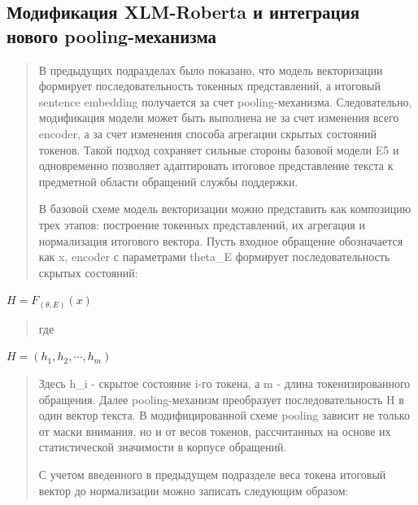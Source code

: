 \hypertarget{ux43cux43eux434ux438ux444ux438ux43aux430ux446ux438ux44f-xlm-roberta-ux438-ux438ux43dux442ux435ux433ux440ux430ux446ux438ux44f-ux43dux43eux432ux43eux433ux43e-pooling-ux43cux435ux445ux430ux43dux438ux437ux43cux430}{%
\subsection{Модификация XLM-Roberta и интеграция нового
pooling-механизма}\label{ux43cux43eux434ux438ux444ux438ux43aux430ux446ux438ux44f-xlm-roberta-ux438-ux438ux43dux442ux435ux433ux440ux430ux446ux438ux44f-ux43dux43eux432ux43eux433ux43e-pooling-ux43cux435ux445ux430ux43dux438ux437ux43cux430}}

\begin{quote}
В предыдущих подразделах было показано, что модель векторизации
формирует последовательность токенных представлений, а итоговый sentence
embedding получается за счет pooling-механизма. Следовательно,
модификация модели может быть выполнена не за счет изменения всего
encoder, а за счет изменения способа агрегации скрытых состояний
токенов. Такой подход сохраняет сильные стороны базовой модели E5 и
одновременно позволяет адаптировать итоговое представление текста к
предметной области обращений службы поддержки.

В базовой схеме модель векторизации можно представить как композицию
трех этапов: построение токенных представлений, их агрегация и
нормализация итогового вектора. Пусть входное обращение обозначается как
x, encoder с параметрами theta\_E формирует последовательность скрытых
состояний:
\end{quote}

\(H = F_{(\theta,E)}(x)\)

\begin{quote}
где
\end{quote}

\(H = \left( h_{1},h_{2},\cdots,h_{m} \right)\)

\begin{quote}
Здесь h\_i - скрытое состояние i-го токена, а m - длина
токенизированного обращения. Далее pooling-механизм преобразует
последовательность H в один вектор текста. В модифицированной схеме
pooling зависит не только от маски внимания, но и от весов токенов,
рассчитанных на основе их статистической значимости в корпусе обращений.

С учетом введенного в предыдущем подразделе веса токена итоговый вектор
до нормализации можно записать следующим образом:
\end{quote}

